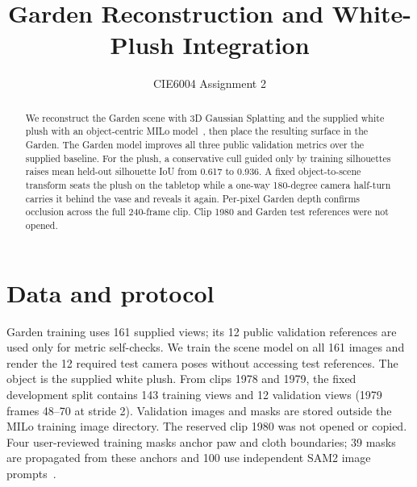 \documentclass[10pt,twocolumn,letterpaper]{article}
\title{Garden Reconstruction and White-Plush Integration}
\author{CIE6004 Assignment 2}
\begin{document}
\maketitle
\begin{abstract}
We reconstruct the Garden scene with 3D Gaussian Splatting and the supplied white plush with an object-centric MILo model~\cite{milo}, then place the resulting surface in the Garden. The Garden model improves all three public validation metrics over the supplied baseline. For the plush, a conservative cull guided only by training silhouettes raises mean held-out silhouette IoU from 0.617 to 0.936. A fixed object-to-scene transform seats the plush on the tabletop while a one-way 180-degree camera half-turn carries it behind the vase and reveals it again. Per-pixel Garden depth confirms occlusion across the full 240-frame clip. Clip 1980 and Garden test references were not opened.
\end{abstract}

\section{Data and protocol}
Garden training uses 161 supplied views; its 12 public validation references are used only for metric self-checks. We train the scene model on all 161 images and render the 12 required test camera poses without accessing test references. The object is the supplied white plush. From clips 1978 and 1979, the fixed development split contains 143 training views and 12 validation views (1979 frames 48--70 at stride 2). Validation images and masks are stored outside the MILo training image directory. The reserved clip 1980 was not opened or copied. Four user-reviewed training masks anchor paw and cloth boundaries; 39 masks are propagated from these anchors and 100 use independent SAM2 image prompts~\cite{sam2}.
\end{document}
